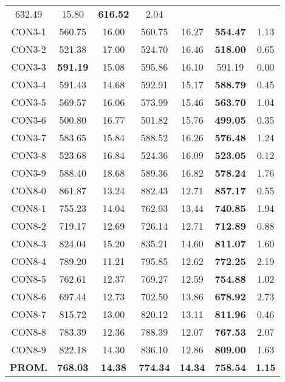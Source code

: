 \begin{table}[ht]
\begin{tabular}{c c c c c c c}
632.49 & 15.80 & \bf{616.52} & 
2.04\\CON3-1 & 560.75 & 16.00 & 
560.75 & 16.27 & \bf{554.47} & 
1.13\\CON3-2 & 521.38 & 17.00 & 
524.70 & 16.46 & \bf{518.00} & 
0.65\\CON3-3 & \bf{591.19} & 15.08 & 
595.86 & 16.10 & 591.19 & 0.00\\
CON3-4 & 591.43 & 14.68 & 
592.91 & 15.17 & \bf{588.79} & 
0.45\\CON3-5 & 569.57 & 16.06 & 
573.99 & 15.46 & \bf{563.70} & 
1.04\\CON3-6 & 500.80 & 16.77 & 
501.82 & 15.76 & \bf{499.05} & 
0.35\\CON3-7 & 583.65 & 15.84 & 
588.52 & 16.26 & \bf{576.48} & 
1.24\\CON3-8 & 523.68 & 16.84 & 
524.36 & 16.09 & \bf{523.05} & 
0.12\\CON3-9 & 588.40 & 18.68 & 
589.36 & 16.82 & \bf{578.24} & 
1.76\\CON8-0 & 861.87 & 13.24 & 
882.43 & 12.71 & \bf{857.17} & 
0.55\\CON8-1 & 755.23 & 14.04 & 
762.93 & 13.44 & \bf{740.85} & 
1.94\\CON8-2 & 719.17 & 12.69 & 
726.14 & 12.71 & \bf{712.89} & 
0.88\\CON8-3 & 824.04 & 15.20 & 
835.21 & 14.60 & \bf{811.07} & 
1.60\\CON8-4 & 789.20 & 11.21 & 
795.85 & 12.62 & \bf{772.25} & 
2.19\\CON8-5 & 762.61 & 12.37 & 
769.27 & 12.59 & \bf{754.88} & 
1.02\\CON8-6 & 697.44 & 12.73 & 
702.50 & 13.86 & \bf{678.92} & 
2.73\\CON8-7 & 815.72 & 13.00 & 
820.12 & 13.11 & \bf{811.96} & 
0.46\\CON8-8 & 783.39 & 12.36 & 
788.39 & 12.07 & \bf{767.53} & 
2.07\\CON8-9 & 822.18 & 14.30 & 
836.10 & 12.86 & \bf{809.00} & 
1.63\\\bf{PROM.} & 
\bf{768.03} & \bf{14.38} & \bf{774.34} & \bf{14.34} & \bf{758.54} & \bf{1.15}\\[1ex]\hline
\end{tabular}
\label{table:nonlin}
\end{table} \clearpage
